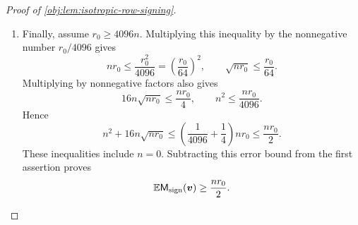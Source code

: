 \begin{proof}[Proof of \cref{obj:lem:isotropic-row-signing}]
\begin{enumerate}
The diagonal-subtraction inequality and its expected diagonal energy now give
\[
\begin{aligned}
\mathbb E\mathsf M_{\rm sign}(\boldsymbol v)
&\geq nr_0-\mathbb E\mathsf M_{\rm off}(\boldsymbol v)\\
&\geq nr_0-n^2-16n\sqrt{nr_0}.
\end{aligned}
\]
Together with the small-sample case, this proves the first assertion for every \(n\).

\item Finally, assume \(r_0\geq4096n\). Multiplying this inequality by the nonnegative number \(r_0/4096\) gives
\[
nr_0\leq\frac{r_0^2}{4096}
=\left(\frac{r_0}{64}\right)^2,
\qquad
\sqrt{nr_0}\leq\frac{r_0}{64}.
\]
Multiplying by nonnegative factors also gives
\[
16n\sqrt{nr_0}\leq\frac{nr_0}{4},
\qquad
n^2\leq\frac{nr_0}{4096}.
\]
Hence
\[
n^2+16n\sqrt{nr_0}
\leq\left(\frac1{4096}+\frac14\right)nr_0
\leq\frac{nr_0}{2}.
\]
These inequalities include \(n=0\). Subtracting this error bound from the first assertion proves
\[
\mathbb E\mathsf M_{\rm sign}(\boldsymbol v)\geq\frac{nr_0}{2}.
\]
\end{enumerate}
\end{proof}

